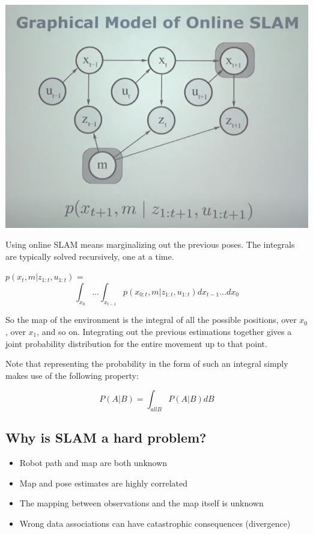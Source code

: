 \documentclass[a4paper]{article}
\begin{document}
\begin{center}
\includegraphics[scale=0.5]{online-slam}
\end{center}

Using online SLAM means marginalizing out the previous poses. The integrals are typically solved recursively, one at a time.

$p(x_{t}, m | z_{1:t}, u_{1:t})$ = 
$$\int_{x_0} \ldots \int_{x_{t-1}} p(x_{0:t}, m | z_{1:t}, u_{1:t}) dx_{t-1} \ldots dx_0 $$

So the map of the environment is the integral of all the possible positions, over $x_0$, over $x_1$, and so on. Integrating out the previous estimations together gives a joint probability distribution for the entire movement up to that point.

Note that representing the probability in the form of such an integral simply makes use of the following property:

$$P(A|B) = \int_{all B} P(A|B) dB$$

\subsection{Why is SLAM a hard problem?}

\begin{itemize}
    \item Robot path and map are both unknown
    \item Map and pose estimates are highly correlated
    \item The mapping between observations and the map itself is unknown
    \item Wrong data associations can have catastrophic consequences (divergence)
\end{itemize}
\end{document}
